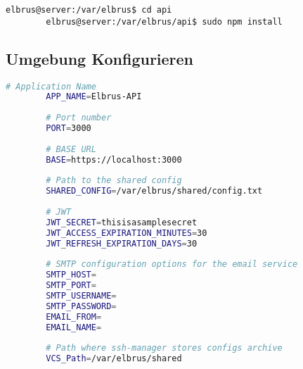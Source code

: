 	\lstset{style=commands}
	\begin{lstlisting}[caption={Nachinstallieren der Abhängigkeiten.}]
		elbrus@server:/var/elbrus$ cd api
		elbrus@server:/var/elbrus/api$ sudo npm install
	\end{lstlisting}

	\subsection[file config]{Umgebung Konfigurieren}
	
	\lstset{style=files}
	\begin{lstlisting}[caption={Anhand von '.env.example' eigene '.env' Datei anlegen.}, language=bash]
		# Application Name
		APP_NAME=Elbrus-API
		
		# Port number
		PORT=3000
		
		# BASE URL
		BASE=https://localhost:3000
		
		# Path to the shared config
		SHARED_CONFIG=/var/elbrus/shared/config.txt
		
		# JWT
		JWT_SECRET=thisisasamplesecret
		JWT_ACCESS_EXPIRATION_MINUTES=30
		JWT_REFRESH_EXPIRATION_DAYS=30
		
		# SMTP configuration options for the email service
		SMTP_HOST=
		SMTP_PORT=
		SMTP_USERNAME=
		SMTP_PASSWORD=
		EMAIL_FROM=
		EMAIL_NAME=
		
		# Path where ssh-manager stores configs archive
		VCS_Path=/var/elbrus/shared
	\end{lstlisting}
	\newpage
	

